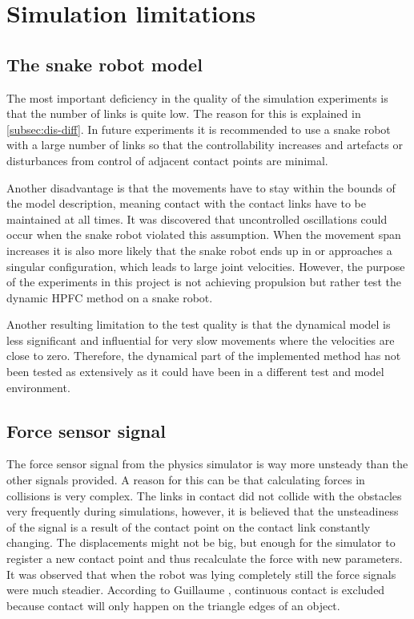

\section{Simulation limitations}

\subsection{The snake robot model}

The most important deficiency in the quality of the simulation experiments is that the number of links is quite low. The reason for this is explained in \ref{subsec:dis-diff}. In future experiments it is recommended to use a snake robot with a large number of links so that the controllability increases and artefacts or disturbances from control of adjacent contact points are minimal.

Another disadvantage is that the movements have to stay within the bounds of the model description, meaning contact with the contact links have to be maintained at all times. It was discovered that uncontrolled oscillations could occur when the snake robot violated this assumption. When the movement span increases it is also more likely that the snake robot ends up in or approaches a singular configuration, which leads to large joint velocities. However, the purpose of the experiments in this project is not achieving propulsion but rather test the dynamic HPFC method on a snake robot.

Another resulting limitation to the test quality is that the dynamical model is less significant and influential for very slow movements where the velocities are close to zero. Therefore, the dynamical part of the implemented method has not been tested as extensively as it could have been in a different test and model environment.

\subsection{Force sensor signal}

The force sensor signal from the physics simulator is way more unsteady than the other signals provided. A reason for this can be that calculating forces in collisions is very complex. The links in contact did not collide with the obstacles very frequently during simulations, however, it is believed that the unsteadiness of the signal is a result of the contact point on the contact link constantly changing. The displacements might not be big, but enough for the simulator to register a new contact point and thus recalculate the force with new parameters. It was observed that when the robot was lying completely still the force signals were much steadier. According to Guillaume \cite{GuillaumeSnakeSIM}, continuous contact is excluded because contact will only happen on the triangle edges of an object.

